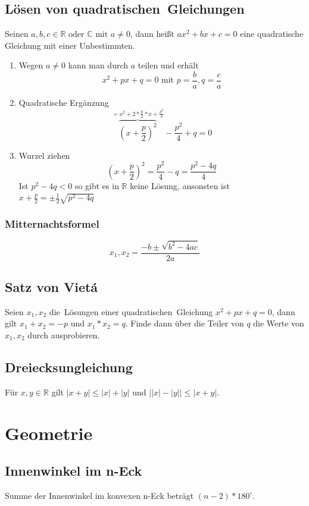 \documentclass[a4paper,10pt]{article}
\begin{document}
\subsection{Lösen von quadratischen Gleichungen}
Seinen $a,b,c \in \mathbb{R} \text{ oder } \mathbb{C} \text{ mit } a \neq 0$, dann heißt $ax^2 + bx +c = 0$ eine quadratische Gleichung mit einer Unbestimmten.
\begin{enumerate}
\item Wegen $a \neq 0$ kann man durch $a$ teilen und erhält
	\[x^2 + px + q = 0 \text{ mit } p=\frac{b}{a}, q=\frac{c}{a}\]
\item Quadratische Ergänzung
	\[\overbrace{\left( x + \frac{p}{2} \right)^2}^{=x^2 + 2*\frac{p}{2}*x + \frac{p^2}{4}} - \frac{p^2}{4} + q = 0\]
\item Wurzel ziehen
	\[\left( x + \frac{p}{2} \right)^2 = \frac{p^2}{4} - q = \frac{p^2 - 4q}{4}\]
	Ist $p^2-4q < 0$ so gibt es in $\mathbb{R}$ keine Lösung, ansonsten ist $x+\frac{p}{2} = \pm \frac{1}{2} \sqrt{p^2-4q}$
\end{enumerate}
\subsubsection*{Mitternachtsformel}
\[x_1,x_2 = \frac{-b \pm \sqrt{b^2-4ac}}{2a}\]

\subsection{Satz von Vietá}
Seien $x_1, x_2$ die Lösungen einer quadratischen Gleichung $x^2+px+q=0$, dann gilt $x_1+x_2=-p$ und $x_1*x_2=q$.
Finde dann über die Teiler von $q$ die Werte von $x_1, x_2$ durch ausprobieren.

\subsection{Dreiecksungleichung}
Für $x,y \in \mathbb{R}$ gilt $|x+y| \leq |x| + |y|$ und $\left||x|-|y|\right| \leq |x + y|$.

\section{Geometrie}

\subsection{Innenwinkel im n-Eck}
Summe der Innenwinkel im konvexen n-Eck beträgt $(n-2) * 180 ^\circ$.
\end{document}
